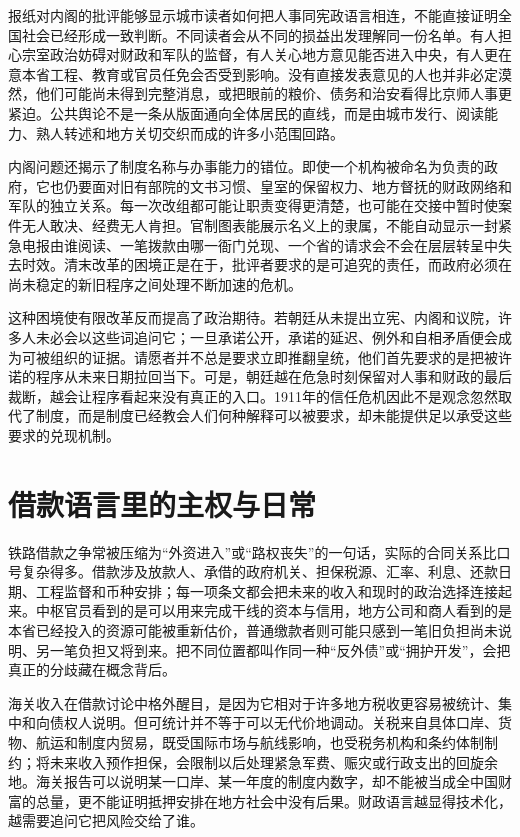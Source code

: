 报纸对内阁的批评能够显示城市读者如何把人事同宪政语言相连，不能直接证明全国社会已经形成一致判断。不同读者会从不同的损益出发理解同一份名单。有人担心宗室政治妨碍对财政和军队的监督，有人关心地方意见能否进入中央，有人更在意本省工程、教育或官员任免会否受到影响。没有直接发表意见的人也并非必定漠然，他们可能尚未得到完整消息，或把眼前的粮价、债务和治安看得比京师人事更紧迫。公共舆论不是一条从版面通向全体居民的直线，而是由城市发行、阅读能力、熟人转述和地方关切交织而成的许多小范围回路。

内阁问题还揭示了制度名称与办事能力的错位。即使一个机构被命名为负责的政府，它也仍要面对旧有部院的文书习惯、皇室的保留权力、地方督抚的财政网络和军队的独立关系。每一次改组都可能让职责变得更清楚，也可能在交接中暂时使案件无人敢决、经费无人肯担。官制图表能展示名义上的隶属，不能自动显示一封紧急电报由谁阅读、一笔拨款由哪一衙门兑现、一个省的请求会不会在层层转呈中失去时效。清末改革的困境正是在于，批评者要求的是可追究的责任，而政府必须在尚未稳定的新旧程序之间处理不断加速的危机。

这种困境使有限改革反而提高了政治期待。若朝廷从未提出立宪、内阁和议院，许多人未必会以这些词追问它；一旦承诺公开，承诺的延迟、例外和自相矛盾便会成为可被组织的证据。请愿者并不总是要求立即推翻皇统，他们首先要求的是把被许诺的程序从未来日期拉回当下。可是，朝廷越在危急时刻保留对人事和财政的最后裁断，越会让程序看起来没有真正的入口。1911年的信任危机因此不是观念忽然取代了制度，而是制度已经教会人们何种解释可以被要求，却未能提供足以承受这些要求的兑现机制。

\section{借款语言里的主权与日常}

铁路借款之争常被压缩为“外资进入”或“路权丧失”的一句话，实际的合同关系比口号复杂得多。借款涉及放款人、承借的政府机关、担保税源、汇率、利息、还款日期、工程监督和币种安排；每一项条文都会把未来的收入和现时的政治选择连接起来。中枢官员看到的是可以用来完成干线的资本与信用，地方公司和商人看到的是本省已经投入的资源可能被重新估价，普通缴款者则可能只感到一笔旧负担尚未说明、另一笔负担又将到来。把不同位置都叫作同一种“反外债”或“拥护开发”，会把真正的分歧藏在概念背后。

海关收入在借款讨论中格外醒目，是因为它相对于许多地方税收更容易被统计、集中和向债权人说明。但可统计并不等于可以无代价地调动。关税来自具体口岸、货物、航运和制度内贸易，既受国际市场与航线影响，也受税务机构和条约体制制约；将未来收入预作担保，会限制以后处理紧急军费、赈灾或行政支出的回旋余地。海关报告可以说明某一口岸、某一年度的制度内数字，却不能被当成全中国财富的总量，更不能证明抵押安排在地方社会中没有后果。财政语言越显得技术化，越需要追问它把风险交给了谁。

